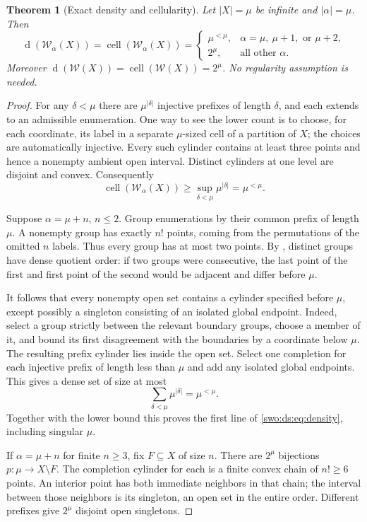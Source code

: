 \documentclass[11pt]{article}
\newtheorem{theorem}{Theorem}[section]
\theoremstyle{definition}
\theoremstyle{remark}
\newcommand{\WO}{\mathcal W}
\newcommand{\dens}{\operatorname{d}}
\newcommand{\cell}{\operatorname{cell}}
\begin{document}
\begin{theorem}[Exact density and cellularity]\label{swo:ds:thm:density}
Let $|X|=\mu$ be infinite and $|\alpha|=\mu$. Then
\[
 \dens(\WO_\alpha(X))=\cell(\WO_\alpha(X))=
 \begin{cases}
 \mu^{<\mu},&\alpha=\mu,\ \mu+1,\text{ or }\mu+2,\\
 2^\mu,&\text{all other }\alpha.
 \end{cases}
\tag{S16.3}\label{swo:ds:eq:density}
\]
Moreover $\dens(\WO(X))=\cell(\WO(X))=2^\mu$.
No regularity assumption is needed.
\end{theorem}
\begin{proof}
For any $\delta<\mu$ there are $\mu^{|\delta|}$ injective prefixes
of length $\delta$, and each extends to an admissible enumeration. One
way to see the lower count is to choose, for each coordinate, its label in
a separate $\mu$-sized cell of a partition of $X$; the choices are
automatically injective. Every such cylinder contains at least three
points and hence a nonempty ambient open interval. Distinct cylinders at
one level are disjoint and convex. Consequently
\[
 \cell(\WO_\alpha(X))\ge
 \sup_{\delta<\mu}\mu^{|\delta|}=\mu^{<\mu}.
\]

Suppose $\alpha=\mu+n$, $n\le2$. Group enumerations by their common
prefix of length $\mu$. A nonempty group has exactly $n!$ points,
coming from the permutations of the omitted $n$ labels. Thus every group
has at most two points. By , distinct groups have
dense quotient order: if two groups were consecutive, the last point of
the first and first point of the second would be adjacent and differ
before $\mu$.

It follows that every nonempty open set contains a cylinder specified
before $\mu$, except possibly a singleton consisting of an isolated
global endpoint. Indeed, select a group strictly between the relevant
boundary groups, choose a member of it, and bound its first disagreement
with the boundaries by a coordinate below $\mu$. The resulting prefix
cylinder lies inside the open set. Select one completion for each
injective prefix of length less than $\mu$ and add any isolated global
endpoints. This gives a dense set of size at most
\[
 \sum_{\delta<\mu}\mu^{|\delta|}=\mu^{<\mu}.
\]
Together with the lower bound this proves the first line of
\eqref{swo:ds:eq:density}, including singular $\mu$.

If $\alpha=\mu+n$ for finite $n\ge3$, fix $F\subseteq X$ of size $n$.
There are $2^\mu$ bijections $p:\mu\to X\setminus F$. The
completion cylinder for each is a finite convex chain of $n!\ge6$
points. An interior point has both immediate neighbors in that chain;
the interval between those neighbors is its singleton, an open set in
the entire order. Different prefixes give $2^\mu$ disjoint open
singletons.


\end{proof}
\end{document}
